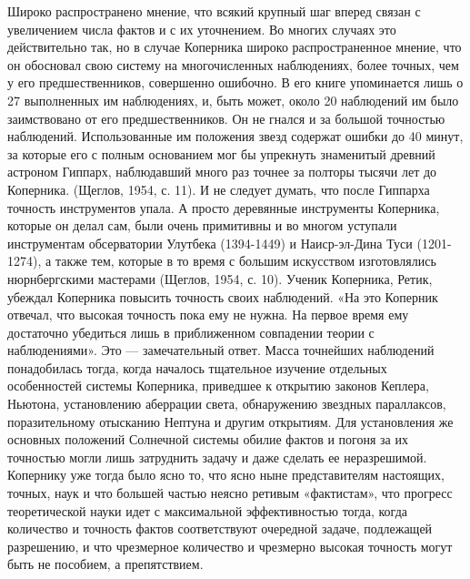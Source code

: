 Широко распространено мнение, что всякий крупный шаг вперед связан с
увеличением числа фактов и с их уточнением. Во многих случаях это
действительно так, но в случае Коперника широко распространенное
мнение, что он обосновал свою систему на многочисленных наблюдениях,
более точных, чем у его предшественников, совершенно ошибочно. В его
книге упоминается лишь о 27 выполненных им наблюдениях, и, быть может,
около 20 наблюдений им было заимствовано от его предшественников. Он
не гнался и за большой точностью наблюдений. Использованные им
положения звезд содержат ошибки до 40 минут, за которые его с полным
основанием мог бы упрекнуть знаменитый древний астроном Гиппарх,
наблюдавший много раз точнее за полторы тысячи лет до Коперника.
(Щеглов, 1954, с. 11). И не следует думать, что после Гиппарха
точность инструментов упала. А просто деревянные инструменты
Коперника, которые он делал сам, были очень примитивны и во многом
уступали инструментам обсерватории Улутбека (1394-1449) и
Наиср-эл-Дина Туси (1201-1274), а также тем, которые в то время с
большим искусством изготовлялись нюрнбергскими мастерами (Щеглов,
1954, с. 10). Ученик Коперника, Ретик, убеждал Коперника повысить
точность своих наблюдений. «На это Коперник отвечал, что высокая
точность пока ему не нужна. На первое время ему достаточно убедиться
лишь в приближенном совпадении теории с наблюдениями». Это ---
замечательный ответ. Масса точнейших наблюдений понадобилась тогда,
когда началось тщательное изучение отдельных особенностей системы
Коперника, приведшее к открытию законов Кеплера, Ньютона, установлению
аберрации света, обнаружению звездных параллаксов, поразительному
отысканию Нептуна и другим открытиям. Для установления же основных
положений Солнечной системы обилие фактов и погоня за их точностью
могли лишь затруднить задачу и даже сделать ее неразрешимой. Копернику
уже тогда было ясно то, что ясно ныне представителям настоящих,
точных, наук и что большей частью неясно ретивым «фактистам», что
прогресс теоретической науки идет с максимальной эффективностью тогда,
когда количество и точность фактов соответствуют очередной задаче,
подлежащей разрешению, и что чрезмерное количество и чрезмерно высокая
точность могут быть не пособием, а препятствием.


